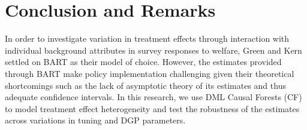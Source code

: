 \documentclass[12pt]{article}
\begin{document}
\begin{table}
\begin{subtable}{\textwidth}
\vspace{0.5cm}
\caption{Number of Estimators} 
\end{subtable}
\end{table}



\clearpage
\section{Conclusion and Remarks}
In order to investigate variation in treatment effects through interaction with individual background attributes in survey responses to welfare, Green and Kern settled on BART as their model of choice. However, the estimates provided through BART make policy implementation challenging given their theoretical shortcomings such as the lack of asymptotic theory of its estimates and thus adequate confidence intervals. In this research, we use DML Causal Forests (CF) to model treatment effect heterogeneity and test the robustness of the estimates across variations in tuning and DGP parameters. \\
\end{document}
